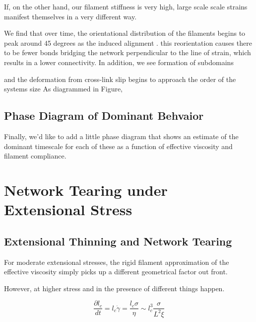 \documentclass[pre,reprint]{revtex4-1}
\begin{document}
If, on the other hand, our filament stiffness is very high, large scale scale strains manifest themselves in a very different way.   

We find that over time, the orientational distribution of the filaments begins to peak around 45 degrees as the induced alignment .  this reorientation causes there to be fewer bonds bridging the network perpendicular to the line of strain, which results in a lower connectivity. In addition, we see formation of subdomains 

and the deformation from cross-link slip begins to approach the order of the systems size
As diagrammed in Figure, 

\subsection{Phase Diagram of Dominant Behvaior}
Finally, we'd like to add a little phase diagram that shows an estimate of the dominant timescale for each of these as a function of effective viscosity and filament compliance.


























\section{Network Tearing under Extensional Stress}


\subsection{Extensional Thinning and Network Tearing}

For moderate extensional stresses, the rigid filament approximation of the effective viscosity simply picks up a different geometrical factor out front.  

However, at higher stress and in the presence of different things happen.

\begin{equation}
\frac{\partial l_c}{dt}=l_c\dot \gamma =\frac{l_c \sigma}{\eta}\sim l_c^3\frac{ \sigma}{L^2 \xi}
\end{equation}
\end{document}
